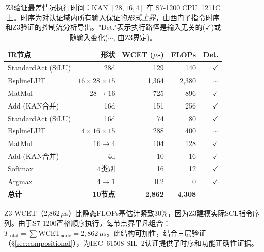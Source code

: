 \documentclass[journal,onecolumn]{IEEEtran}
\theoremstyle{definition}
\theoremstyle{plain}
\theoremstyle{remark}
\begin{document}
\begin{table}[!t]
\centering
\caption{Z3验证最差情况执行时间：KAN $[28,16,4]$ 在 S7-1200 CPU~1211C上。时序为对认证域内所有输入保证的\textit{形式上界}，由西门子指令时序和Z3验证的控制流分析导出。"Det."表示执行路径是输入无关的($\checkmark$)或随输入变化($\sim$, 由Z3界定)。}
\label{tab:wcet}
\small
\begin{tabular}{lrrrr}
\toprule
\textbf{IR节点} & \textbf{形状} & \textbf{WCET ($\mu$s)} & \textbf{FLOPs} & \textbf{Det.} \\
\midrule
StandardAct (SiLU) & 28d & 129 & 140 & $\checkmark$ \\
BsplineLUT         & $16{\times}28{\times}15$ & 1,364 & 2,380 & $\sim$ \\
MatMul             & $28{\rightarrow}16$ & 725 & 896 & $\checkmark$ \\
Add (KAN合并)      & 16d & 151 & 256 & $\checkmark$ \\
StandardAct (SiLU) & 16d & 74 & 80 & $\checkmark$ \\
BsplineLUT         & $4{\times}16{\times}15$ & 288 & 400 & $\sim$ \\
MatMul             & $16{\rightarrow}4$ & 104 & 128 & $\checkmark$ \\
Add (KAN合并)      & 4d & 10 & 16 & $\checkmark$ \\
Softmax            & 4类别 & 16 & 12 & $\checkmark$ \\
Argmax             & $4{\rightarrow}1$ & 0.2 & 0 & $\checkmark$ \\
\midrule
\textbf{总计} & \textbf{10节点} & \textbf{2,862} & \textbf{4,308} & --- \\
\bottomrule
\end{tabular}
\end{table}

Z3 WCET（2,862\,$\mu$s）比静态FLOPs基估计紧致30\%，因为Z3建模实际SCL指令序列。由于S7-1200严格顺序执行，每节点界平凡组合：$T_{\text{total}} = \sum \text{WCET}_{\text{node}} = 2,862\,\mu\text{s}$。此结构可加性，结合三层验证（\S\ref{sec:compositional}），为IEC~61508 SIL~2认证提供了时序和功能正确性证据。
\end{document}
